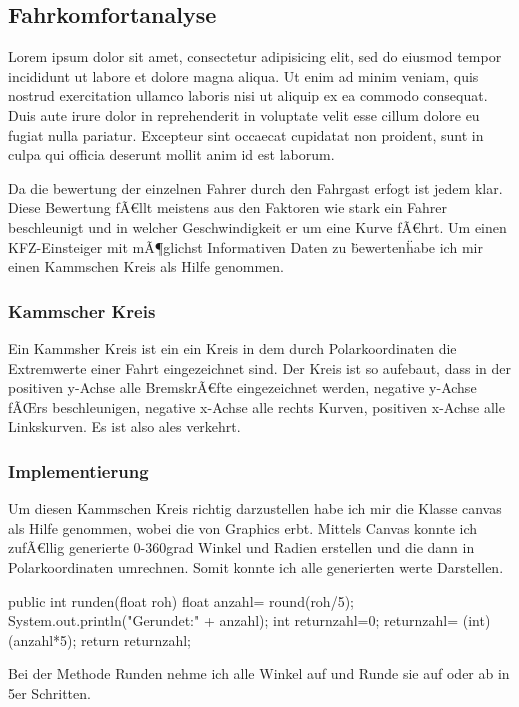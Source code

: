 \subsection{Fahrkomfortanalyse}

Lorem ipsum dolor sit amet, consectetur adipisicing elit, sed do eiusmod
tempor incididunt ut labore et dolore magna aliqua. Ut enim ad minim veniam,
quis nostrud exercitation ullamco laboris nisi ut aliquip ex ea commodo
consequat. Duis aute irure dolor in reprehenderit in voluptate velit esse
cillum dolore eu fugiat nulla pariatur. Excepteur sint occaecat cupidatat non
proident, sunt in culpa qui officia deserunt mollit anim id est laborum.

Da die bewertung der einzelnen Fahrer durch den Fahrgast erfogt ist jedem klar.
Diese Bewertung fÃ€llt meistens aus den Faktoren wie stark ein Fahrer beschleunigt und in welcher Geschwindigkeit er um eine Kurve fÃ€hrt.
Um einen KFZ-Einsteiger mit mÃ¶glichst Informativen Daten zu \"bewerten\" habe ich mir einen Kammschen Kreis als Hilfe genommen.

\subsubsection{Kammscher Kreis }
Ein Kammsher Kreis ist ein ein Kreis in dem durch Polarkoordinaten die Extremwerte einer Fahrt eingezeichnet sind.
Der Kreis ist so aufebaut, dass in der positiven y-Achse alle BremskrÃ€fte eingezeichnet werden, negative y-Achse fÃŒrs beschleunigen,
negative x-Achse alle rechts Kurven, positiven x-Achse alle Linkskurven.
Es ist also ales verkehrt.

\subsubsection{Implementierung}
Um diesen Kammschen Kreis richtig darzustellen habe ich mir die Klasse canvas als Hilfe genommen, wobei die von Graphics erbt.
Mittels Canvas konnte ich zufÃ€llig generierte 0-360grad Winkel und Radien erstellen und die dann in Polarkoordinaten umrechnen.
Somit konnte ich alle generierten werte Darstellen. 

public int runden(float roh){
	float anzahl= round(roh/5);
	System.out.println("Gerundet:" + anzahl);
	int returnzahl=0;
	returnzahl= (int) (anzahl*5);
	return returnzahl;
}

Bei der Methode Runden nehme ich alle Winkel auf und Runde sie auf oder ab in 5er Schritten.



\clearpage %